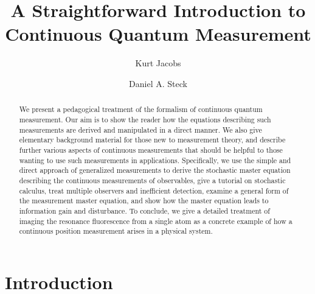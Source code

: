 \documentclass[12pt,aps,onecolum,superscriptaddress,footinbib,floatfix,showpacs]{revtex4-1}
\begin{document}
\title{A Straightforward Introduction to Continuous Quantum Measurement}


\author{Kurt Jacobs}

\author{Daniel A. Steck}


\begin{abstract}
We present a pedagogical treatment of the formalism of continuous
quantum measurement.  Our aim is to show the reader how the equations
describing such measurements are derived and manipulated in a direct
manner.  We also give elementary background material for those new to
measurement theory, and describe further various aspects of continuous
measurements that should be helpful to those wanting to use such
measurements in applications.  Specifically, we use the simple
and direct approach of
generalized measurements to derive the stochastic master equation
describing the continuous measurements of observables, give a tutorial
on stochastic calculus, treat multiple observers and inefficient
detection, examine a general form of the measurement master equation,
and show how the master equation leads to information gain and
disturbance.  To conclude, we give a detailed treatment of imaging the
resonance fluorescence from a single atom as a concrete example of how
a continuous position measurement arises in a physical system.
\end{abstract}

\maketitle

\section{Introduction}
\end{document}
